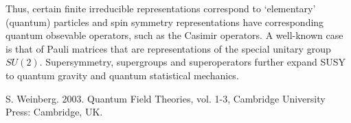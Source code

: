 \documentclass[12pt]{article}
\theoremstyle{plain}
\theoremstyle{definition}
\numberwithin{equation}{section}
\begin{document}
 Thus, certain finite irreducible representations correspond to `elementary' (quantum) particles and spin symmetry
representations have corresponding quantum obsevable operators, such as the Casimir operators. A well-known case is that of Pauli matrices that are representations of the special unitary group $SU(2)$. Supersymmetry, supergroups and
superoperators further expand SUSY to quantum gravity and quantum statistical mechanics.

\begin{thebibliography}{9}
S. Weinberg. 2003. Quantum Field Theories, vol. 1-3, Cambridge University Press: Cambridge, UK.
\end{thebibliography}
\end{document}
